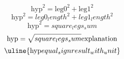 \[\text{{{hyp}}}^{{2}}=\text{{{leg0}}}^{{2}}+\text{{{leg1}}}^{{2}}\]
\[\text{{{hyp}}}^{{2}}={leg0_length}^{{2}}+{leg1_length}^{{2}}\]
\[\text{{{hyp}}}^{{2}}={square_legs_sum}\]
\[\text{{{hyp}}}=\sqrt{{\mathstrut {square_legs_sum}}}\text{{{explanation}}}\]
\[\uline{{\text{{{hyp}}}{equal_sign}{result_with_unit}}}\]
